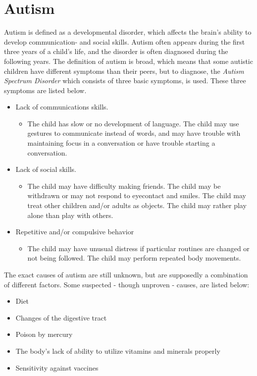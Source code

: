 \section{Autism}
Autism is defined as a developmental disorder, which affects the brain's ability to develop communication- and social skills. Autism often appears during the first three years of a child's life, and the disorder is often diagnosed during the following years.
The definition of autism is broad, which means that some autistic children have different symptoms than their peers, but to diagnose, the \emph{Autism Spectrum Disorder} which consists of three basic symptoms, is used. These three symptoms are listed below.
\begin{itemize}

  \item{Lack of communications skills.}
   \begin{itemize}
     \item{The child has slow or no development of language. The child may use gestures to communicate instead of words, and may have trouble with maintaining focus in a conversation or have trouble starting a conversation.}
   \end{itemize}
   
  \item{Lack of social skills.}
   \begin{itemize}
     \item{The child may have difficulty making friends. The child may be withdrawn or may not respond to eyecontact and smiles. The child may treat other children and/or adults as objects. The child may rather play alone than play with others.}
   \end{itemize}

  \item{Repetitive and/or compulsive behavior}
    \begin{itemize}
      \item{The child may have unusual distress if particular routines are changed or not being followed. The child may perform repeated body movements. \cite{autism}}
    \end{itemize}
  
\end{itemize}

The exact causes of autism are still unknown, but are supposedly a combination of different factors. Some suspected - though unproven - causes, are listed below:

\begin{itemize}
  
  \item{Diet}
  \item{Changes of the digestive tract}
  \item{Poison by mercury}
  \item{The body's lack of ability to utilize vitamins and minerals properly}
  \item{Sensitivity against vaccines\cite{autism}}
  
\end{itemize}

